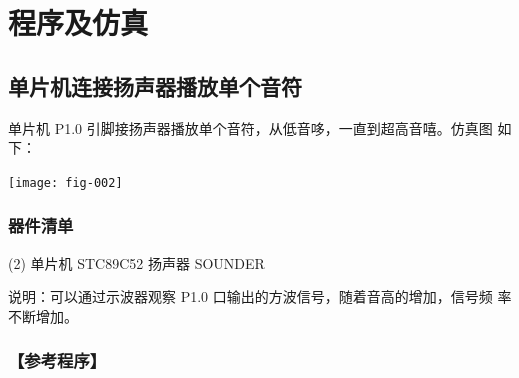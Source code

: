 \documentclass{swfulabreport}
\begin{document}
\maketitle %

\section{程序及仿真}

\subsection{单片机连接扬声器播放单个音符}

单片机 P1.0 引脚接扬声器播放单个音符，从低音哆，一直到超高音嘻。仿真图
如下：

\begin{center}
  \texttt{[image: fig-002]}
\end{center}

\subsubsection{器件清单}

\begin{tasks}(2)
  \task 单片机 STC89C52
  \task 扬声器 SOUNDER
\end{tasks}

说明：可以通过示波器观察 P1.0 口输出的方波信号，随着音高的增加，信号频
率不断增加。

\subsubsection{【参考程序】}
\end{document}
